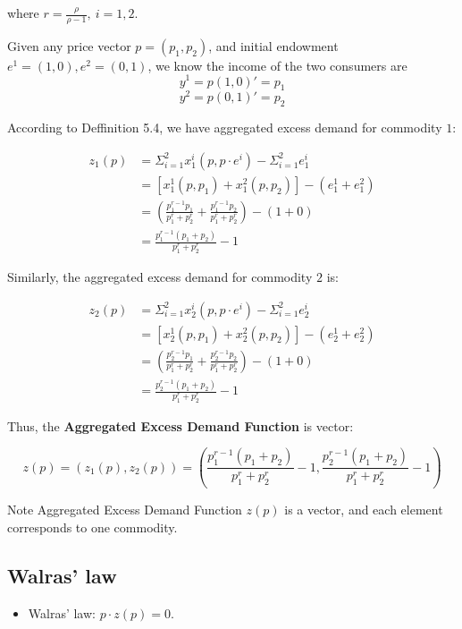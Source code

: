 \documentclass{article}
\begin{document}
where $r= \frac{\rho}{\rho-1},\ i = 1,2$.

Given any price vector $p = (p_1,p_2)$, and initial endowment $e^1 = (1,0), e^2 = (0,1)$, we know the income of the two consumers are 
$$y^1= p(1,0)' = p_1$$
$$y^2= p(0,1)' = p_2$$

According to Deffinition 5.4, we have aggregated excess demand for commodity $1$:

\begin{align*}
z_1(p) &= \Sigma_{i=1}^2 x^i_1(p,p\cdot e^i) - \Sigma_{i=1}^2 e^i_1 \\
&= [x^1_1(p,p_1) + x^2_1(p,p_2)] -  (e^1_1+e^2_1) \\
&= ( \frac{p^{r-1}_1 p_1}{p_1^r+p_2^r} + \frac{p^{r-1}_1 p_2}{p_1^r+p_2^r}) - (1+0) \\
&= \frac{p^{r-1}_1 (p_1+p_2)}{p_1^r+p_2^r} -1
\end{align*}

Similarly, the aggregated excess demand for commodity $2$ is:

\begin{align*}
z_2(p) &= \Sigma_{i=1}^2 x^i_2(p,p\cdot e^i) - \Sigma_{i=1}^2 e^i_2 \\
&= [x^1_2(p,p_1) + x^2_2(p,p_2)] -  (e^1_2+e^2_2) \\
&= ( \frac{p^{r-1}_2 p_1}{p_1^r+p_2^r} + \frac{p^{r-1}_2 p_2}{p_1^r+p_2^r}) - (1+0) \\
&= \frac{p^{r-1}_2 (p_1+p_2)}{p_1^r+p_2^r} -1
\end{align*}

Thus, the  \textbf{Aggregated Excess Demand Function} is vector:

$$z(p) = (z_1(p),z_2(p)) = (\frac{p^{r-1}_1 (p_1+p_2)}{p_1^r+p_2^r} -1,\frac{p^{r-1}_2 (p_1+p_2)}{p_1^r+p_2^r} -1)$$


\begin{mdframed}[backgroundcolor=yellow!20,linecolor=white]
Note Aggregated Excess Demand Function $z(p)$ is a vector, and each element corresponds to one commodity.
\end{mdframed}

\subsection{Walras' law}

\begin{mdframed}[backgroundcolor=blue!20,linecolor=white]
\begin{itemize}
\item Walras' law: $p \cdot z(p) = 0$.
\end{itemize}
\end{mdframed}
\end{document}
